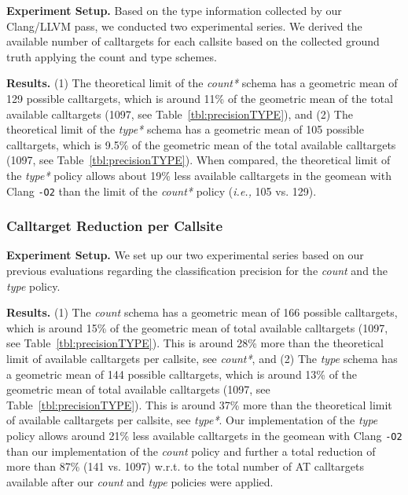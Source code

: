 \textbf{Experiment Setup.} Based on the type information collected by our Clang/LLVM pass, we conducted two experimental series.
We derived the available number of calltargets for each callsite based on the collected ground truth applying the {count} and {type} schemes.

\textbf{Results.}
(1) The theoretical limit of the \textit{count*} schema has a geometric mean of 129 possible calltargets, which is around 11\% of the geometric mean of the total available calltargets (1097, see Table~\ref{tbl:precisionTYPE}), and
(2) The theoretical limit of the \textit{type*} schema has a geometric mean of 105 possible calltargets, which is 9.5\% of the geometric mean of the total available calltargets (1097, see Table~\ref{tbl:precisionTYPE}).
When compared, the theoretical limit of the \textit{type*} policy allows about 19\% less available calltargets in the geomean with Clang \texttt{-O2} than the limit of the \textit{count*} policy (\textit{i.e.,} 105 vs. 129).

\subsubsection{Calltarget Reduction per Callsite}
\label{subsection:typeshieldvslimitcount}
\textit{}

\textbf{Experiment Setup.} We set up our two experimental series based on our previous evaluations regarding the classification precision for the \textit{count} and the \textit{type} policy.

\textbf{Results.}
(1) The \textit{count} schema has a geometric mean of 166 possible calltargets, which is around 15\% of the geometric mean of total available calltargets (1097, see Table~\ref{tbl:precisionTYPE}). 
This is around 28\% more than the theoretical limit of available calltargets per callsite, see \textit{count*}, and
(2)  The \textit{type} schema has a geometric mean of 144 possible calltargets, which is around 13\% of the geometric mean of total available calltargets (1097, see Table~\ref{tbl:precisionTYPE}). 
This is around 37\% more than the theoretical limit of available calltargets per callsite, see \textit{type*}.
Our implementation of the \textit{type} policy allows around 21\% less available calltargets in the geomean with Clang \texttt{-O2} than our implementation of the \textit{count} policy and 
further a total reduction of more than 87\% (141 vs. 1097) w.r.t. to the total number of AT calltargets available after our \textit{count} and \textit{type} policies were applied. 


